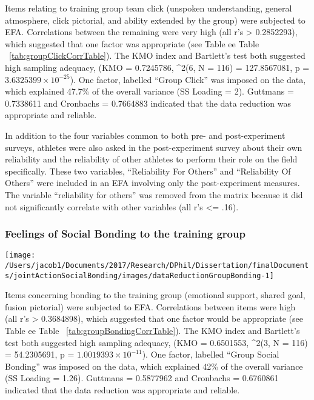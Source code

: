 \documentclass[english]{article}\usepackage[]{graphicx}\usepackage[]{color}
\makeatletter
\def\maxwidth{ %
  \ifdim\Gin@nat@width>\linewidth
    \linewidth
  \else
    \Gin@nat@width
  \fi
}
\newenvironment{knitrout}{}{} %
\makeatother
\begin{document}
Items relating to training group team click (unspoken understanding, general atmosphere, click pictorial, and ability extended by the group) were subjected to EFA.   Correlations between the remaining were very high (all r's > 0.2852293), which suggested that one factor was appropriate (see Table ee Table ~\ref{tab:groupClickCorrTable}). The KMO index and Bartlett's test both suggested high sampling adequacy, (KMO =  0.7245786, \chi^2(6, N = 116) = 127.8567081, p = \ensuremath{3.6325399\times 10^{-25}}).
One factor, labelled ``Group Click'' was imposed on the data, which explained 47.7\% of the overall variance (SS Loading = 2). Guttmans \lambda = 0.7338611 and Cronbachs \alpha = 0.7664883 indicated that the data reduction was appropriate and reliable.

In addition to the four variables common to both pre- and post-experiment surveys, athletes were also asked in the post-experiment survey about their own reliability and the reliability of other athletes to perform their role on the field specifically. These two variables, ``Reliability For Others'' and ``Reliability Of Others'' were included in an EFA involving only the post-experiment measures.  The variable ``reliability for others'' was removed from the matrix because it did not significantly correlate with other variables (all r's <= .16).

\subsubsection{Feelings of Social Bonding to the training group}
\begin{knitrout}
\color{fgcolor}

{\centering \texttt{[image: /Users/jacob1/Documents/2017/Research/DPhil/Dissertation/finalDocuments/jointActionSocialBonding/images/dataReductionGroupBonding-1]} 

}



\end{knitrout}

Items concerning bonding to the training group (emotional support, shared goal, fusion pictorial) were subjected to EFA.  Correlations between items were high (all r's > 0.3684898), which suggested that one factor would be appropriate (see Table ee Table ~\ref{tab:groupBondingCorrTable}). The KMO index and Bartlett's test both suggested high sampling adequacy, (KMO =  0.6501553, \chi^2(3, N = 116) = 54.2305691, p = \ensuremath{1.0019393\times 10^{-11}}).
One factor, labelled ``Group Social Bonding'' was imposed on the data, which explained 42\% of the overall variance (SS Loading = 1.26). Guttmans \lambda = 0.5877962 and Cronbachs \alpha = 0.6760861 indicated that the data reduction was appropriate and reliable.
\end{document}

